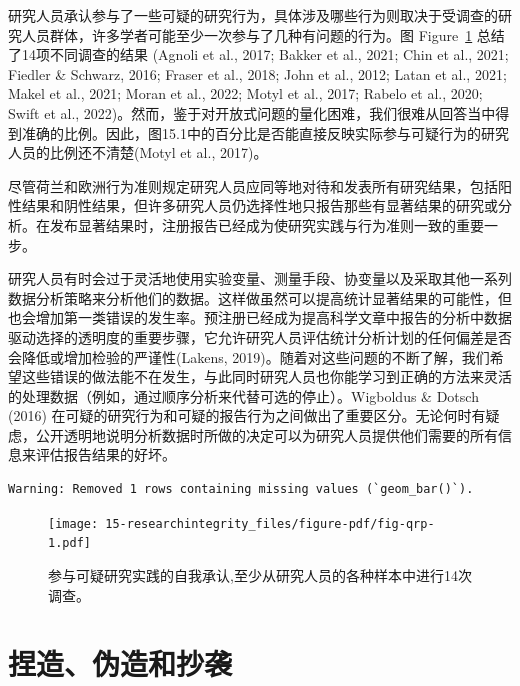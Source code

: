 \documentclass[
  letterpaper,
  DIV=11,
  numbers=noendperiod]{scrreprt}
\begin{document}
研究人员承认参与了一些可疑的研究行为，具体涉及哪些行为则取决于受调查的研究人员群体，许多学者可能至少一次参与了几种有问题的行为。图
Figure~\ref{fig-qrp} 总结了14项不同调查的结果 (Agnoli et al., 2017;
Bakker et al., 2021; Chin et al., 2021; Fiedler \& Schwarz, 2016; Fraser
et al., 2018; John et al., 2012; Latan et al., 2021; Makel et al., 2021;
Moran et al., 2022; Motyl et al., 2017; Rabelo et al., 2020; Swift et
al.,
2022)。然而，鉴于对开放式问题的量化困难，我们很难从回答当中得到准确的比例。因此，图15.1中的百分比是否能直接反映实际参与可疑行为的研究人员的比例还不清楚(Motyl
et al., 2017)。

尽管荷兰和欧洲行为准则规定研究人员应同等地对待和发表所有研究结果，包括阳性结果和阴性结果，但许多研究人员仍选择性地只报告那些有显著结果的研究或分析。在发布显著结果时，注册报告已经成为使研究实践与行为准则一致的重要一步。

研究人员有时会过于灵活地使用实验变量、测量手段、协变量以及采取其他一系列数据分析策略来分析他们的数据。这样做虽然可以提高统计显著结果的可能性，但也会增加第一类错误的发生率。预注册已经成为提高科学文章中报告的分析中数据驱动选择的透明度的重要步骤，它允许研究人员评估统计分析计划的任何偏差是否会降低或增加检验的严谨性(Lakens,
2019)。随着对这些问题的不断了解，我们希望这些错误的做法能不在发生，与此同时研究人员也你能学习到正确的方法来灵活的处理数据（例如，通过顺序分析来代替可选的停止）。Wigboldus
\& Dotsch (2016)
在可疑的研究行为和可疑的报告行为之间做出了重要区分。无论何时有疑虑，公开透明地说明分析数据时所做的决定可以为研究人员提供他们需要的所有信息来评估报告结果的好坏。

\begin{verbatim}
Warning: Removed 1 rows containing missing values (`geom_bar()`).
\end{verbatim}

\begin{figure}

{\centering \texttt{[image: 15-researchintegrity\_files/figure-pdf/fig-qrp-1.pdf]}

}

\caption{\label{fig-qrp}参与可疑研究实践的自我承认,至少从研究人员的各种样本中进行14次调查。}

\end{figure}

\hypertarget{ux634fux9020ux4f2aux9020ux548cux6284ux88ad}{%
\section{捏造、伪造和抄袭}\label{ux634fux9020ux4f2aux9020ux548cux6284ux88ad}}
\end{document}
